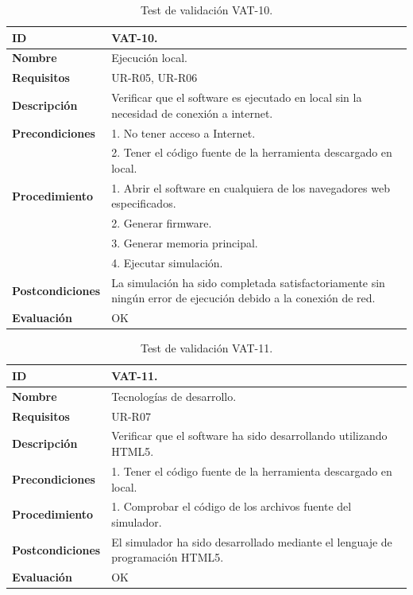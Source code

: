 \begin{center}
\begin{table}[htb]
\centering
\begin{tabular}{@{}p{2.5cm} p{9cm}@{}} 
\toprule
\textbf{ID} 					& VAT-10. \\
\midrule
\textbf{Nombre} 				& Ejecución local. \\
\midrule
\textbf{Requisitos} 		& UR-R05, UR-R06\\
\midrule
\textbf{Descripción} 		& Verificar que el software es ejecutado en local sin la necesidad de conexión a internet. \\
\midrule
\textbf{Precondiciones}		& 1. No tener acceso a Internet.\\
											& 2. Tener el código fuente de la herramienta descargado en local.\\
\midrule
\textbf{Procedimiento}			& 1. Abrir el software en cualquiera de los navegadores web especificados. \\
							& 2. Generar firmware.\\
							& 3. Generar memoria principal.\\
							& 4. Ejecutar simulación.\\
\midrule
\textbf{Postcondiciones} 		&  La simulación ha sido completada satisfactoriamente sin ningún error de ejecución debido a la conexión de red.\\
\midrule
\textbf{Evaluación} 			& OK \\
\bottomrule
\end{tabular}
\caption{Test de validación VAT-10.}
\label{tab:vat-10}
\end{table}
\end{center}

\begin{center}
\begin{table}[htb]
\centering
\begin{tabular}{@{}p{2.5cm} p{9cm}@{}} 
\toprule
\textbf{ID} 					& VAT-11. \\
\midrule
\textbf{Nombre} 				& Tecnologías de desarrollo. \\
\midrule
\textbf{Requisitos} 		& UR-R07\\
\midrule
\textbf{Descripción} 		& Verificar que el software ha sido desarrollando utilizando HTML5. \\
\midrule
\textbf{Precondiciones}		& 1. Tener el código fuente de la herramienta descargado en local. \\
\midrule
\textbf{Procedimiento}		& 1. Comprobar el código de los archivos fuente del simulador.\\
\midrule
\textbf{Postcondiciones} 		&  El simulador ha sido desarrollado mediante el lenguaje de programación HTML5.\\
\midrule
\textbf{Evaluación} 			& OK \\
\bottomrule
\end{tabular}
\caption{Test de validación VAT-11.}
\label{tab:vat-11}
\end{table}
\end{center}

